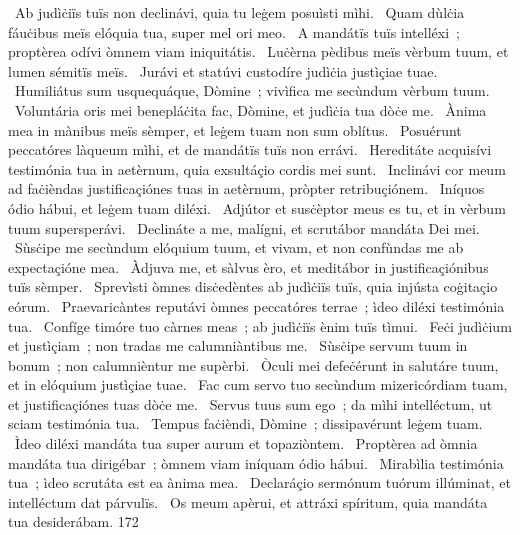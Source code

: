 {~Ab judìċiïs tuïs non declinávi, quia tu leġem posuìsti mìhi.
~Quam dùlċia fáuċibus meïs elóquia tua, super mel ori meo.
~A mandátïs tuïs intelléxi~; proptèrea odívi òmnem viam iniquitátis.
~Luċèrna pèdibus meïs vèrbum tuum, et lumen sémitïs meïs.
~Jurávi et statúvi custodíre judìċia justìçiae tuae.
~Humiliátus sum usquequáque, Dòmine~; vivìfica me secùndum vèrbum tuum.
~Voluntária oris mei benepláċita fac, Dòmine, et judìċia tua dòċe me.
~Ànima mea in mànibus meïs sèmper, et leġem tuam non sum oblítus.
~Posuérunt peccatóres làqueum mìhi, et de mandátïs tuïs non errávi.
~Hereditáte acquisívi testimónia tua in aetèrnum, quia exsultáçio cordis mei sunt.
~Inclinávi cor meum ad faċièndas justificaçiónes tuas in aetèrnum, pròpter retribuçiónem.
~Iníquos ódio hábui, et leġem tuam diléxi.
~Adjútor et susċèptor meus es tu, et in vèrbum tuum supersperávi.
~Declináte a me, malígni, et scrutábor mandáta Dei mei.
~Sùsċipe me secùndum elóquium tuum, et vivam, et non confùndas me ab expectaçióne mea.
~Àdjuva me, et sàlvus èro, et meditábor in justificaçiónibus tuïs sèmper.
~Sprevìsti òmnes disċedèntes ab judìċiïs tuïs, quia injústa coġitaçio eórum.
~Praevaricàntes reputávi òmnes peccatóres terrae~; ìdeo diléxi testimónia tua.
~Confíge timóre tuo càrnes meas~; ab judìċiïs ènim tuïs tìmui.
~Feċi judìċium et justìçiam~; non tradas me calumniàntibus me.
~Sùsċipe servum tuum in bonum~; non calumnièntur me supèrbi.
~Òculi mei defeċérunt in salutáre tuum, et in elóquium justìçiae tuae.
~Fac cum servo tuo secùndum mizericórdiam tuam, et justificaçiónes tuas dòċe me.
~Servus tuus sum ego~; da mìhi intelléctum, ut sciam testimónia tua.
~Tempus faċièndi, Dòmine~; dissipavérunt leġem tuam.
~Ìdeo diléxi mandáta tua super aurum et topaziòntem.
~Proptèrea ad òmnia mandáta tua dirigébar~; òmnem viam iníquam ódio hábui.
~Mirabìlia testimónia tua~; ìdeo scrutáta est ea ànima mea.
~Declaráçio sermónum tuórum illúminat, et intelléctum dat párvulïs.
~Os meum apèrui, et attráxi spíritum, quia mandáta tua desiderábam.
}
{17}{2}

